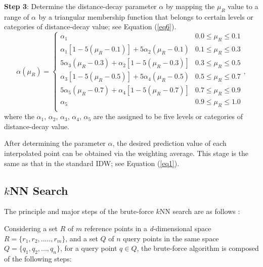 \documentclass[final,5p,times,twocolumn,authoryear]{elsarticle}
\begin{document}
	\textbf{Step 3}: Determine the distance-decay parameter $\alpha $ by mapping 
	the $\mu _{R}$ value to a range of $\alpha _{ }$ by a triangular 
	membership function that belongs to certain levels or categories of 
	distance-decay value; see Equation (\ref{eq6}).
\begin{equation}
\label{eq6}
\alpha \left( {\mu _R } \right)=\left\{ {{\begin{array}{ll}
		{\alpha _1 } & {\mbox{0.0}\le \mu _R \le \mbox{0.1}} \\
		{\alpha _1 \left[ {1-5\left( {\mu _R -0\mbox{.}1} \right)} \right]+5\alpha 
			_2 \left( {\mu _R -0\mbox{.}1} \right)} & {\mbox{0.1}\le \mu _R \le 
			\mbox{0.3}} \\
		{5\alpha _3 \left( {\mu _R -0\mbox{.}3} \right)+\alpha _2 \left[ {1-5\left( 
				{\mu _R -0\mbox{.}3} \right)} \right]} & {\mbox{0.3}\le \mu _R \le 
			0\mbox{.}5} \\
		{\alpha _3 \left[ {1-5\left( {\mu _R -0\mbox{.5}} \right)} \right]+5\alpha 
			_4 \left( {\mu _R -0\mbox{.}5} \right)} & {\mbox{0.5}\le \mu _R \le 
			\mbox{0.7}} \\
		{5\alpha _5 \left( {\mu _R -0\mbox{.7}} \right)+\alpha _4 \left[ {1-5\left( 
				{\mu _R -0\mbox{.7}} \right)} \right]} & {\mbox{0.7}\le \mu _R \le 
			\mbox{0.9}} \\
		{\alpha _5 } & {\mbox{0.9}\le \mu _R \le \mbox{1.0}} \\
		\end{array} }} \right.,
\end{equation}
			where the $\alpha _{1}$, $\alpha _{2}$, $\alpha _{3}$, $\alpha 
			_{4}$, $\alpha _{5}$ are the assigned to be five levels or categories of 
			distance-decay value.
			
			After determining the parameter $\alpha $, the desired prediction value of 
			each interpolated point can be obtained via the weighting average. This 
			stage is the same as that in the standard IDW; see Equation (\ref{eq1}).
			
			\subsection{$k$NN Search}
			The principle and major steps of the brute-force $k$NN search are as follows \citep{n02DBLP:conf/cvpr/GarciaDB08}:
			
			Considering a set $R$ of $m$ reference points in a \textit{d}-dimensional 
			space $R=\{r_1 ,r_2 ,.....,r_m \}$, and a set $Q$ of $n$ query points in the 
			same space $Q = \mbox{\{}q_1 ,q_2 , ... , q_n \mbox{\}}$, for a query point 
			$q \in Q$, the brute-force algorithm is composed of the following steps:
			
\end{document}
